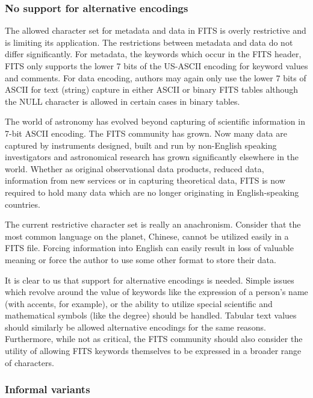 \documentclass[final,authoryear,5p,times,twocolumn]{elsarticle}
\begin{document}
\subsubsection{No support for alternative encodings}


The allowed character set for metadata and data in FITS is overly
restrictive and is limiting its application. The restrictions between
metadata and data do not differ significantly. For metadata, the
keywords which occur in the FITS header, FITS only supports the lower
7 bits of the US-ASCII encoding for keyword values and comments. For
data encoding, authors may again only use the lower 7 bits of ASCII
for text (string) capture in either ASCII or binary FITS tables
although the NULL character is allowed in certain cases in binary
tables.


The world of astronomy has evolved beyond capturing of scientific
information in 7-bit ASCII encoding. The FITS community has grown. Now
many data are captured by instruments designed, built and run by
non-English speaking investigators and astronomical research has grown
significantly elsewhere in the world. Whether as original
observational data products, reduced data, information from new
services or in capturing theoretical data, FITS is now required to
hold many data which are no longer originating in English-speaking
countries.


The current restrictive character set is really an
anachronism. Consider that the most common language on the planet,
Chinese, cannot be utilized easily in a FITS file. Forcing information
into English can easily result in loss of valuable meaning or force
the author to use some other format to store their data.


It is clear to us that support for alternative encodings is
needed. Simple issues which revolve around the value of keywords
like the expression of a person's name (with accents, for example), or
the ability to utilize special scientific and mathematical symbols
(like the degree) should be handled. Tabular text values should
similarly be allowed alternative encodings for the same
reasons. Furthermore, while not as critical, the FITS community should
also consider the utility of allowing FITS keywords themselves to be
expressed in a broader range of characters.


\subsubsection{Informal variants}
\end{document}
